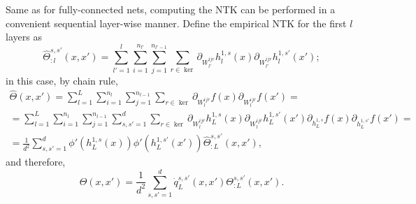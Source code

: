 \documentclass{article}
\begin{document}
    Same as for fully-connected nets, computing the NTK can be performed in a convenient sequential layer-wise manner.
    Define the empirical NTK for the first $l$ layers as
    \begin{equation}
        \hat\Theta_{:l}^{s,s'}(x,x') 
        = \sum_{l'=1}^l \sum_{i=1}^{n_{l'}} \sum_{j=1}^{n_{l'-1}} \sum_{r \in \ker} \partial_{W_{l'}^{ijr}} h_l^{1,s}(x) \partial_{W_{l'}^{ijr}} h_l^{1,s'}(x');
    \end{equation}
    in this case, by chain rule,
    \begin{multline}
        \hat\Theta(x,x')
        = \sum_{l=1}^L \sum_{i=1}^{n_l} \sum_{j=1}^{n_{l-1}} \sum_{r \in \ker} \partial_{W_l^{ijr}} f(x) \partial_{W_l^{ijr}} f(x')
        =\\= \sum_{l=1}^L \sum_{i=1}^{n_l} \sum_{j=1}^{n_{l-1}} \sum_{s,s'=1}^d \sum_{r \in \ker} \partial_{W_l^{ijr}} h_L^{1,s}(x) \partial_{W_l^{ijr}} h_L^{1,s'}(x') \partial_{h_L^{1,s}} f(x) \partial_{h_L^{1,s'}} f(x')
        =\\= \frac{1}{d^2} \sum_{s,s'=1}^d \phi'(h_L^{1,s}(x)) \phi'(h_L^{1,s'}(x')) \hat\Theta_{:L}^{s,s'}(x,x'),
    \end{multline}
    and therefore,
    \begin{equation}
        \Theta(x,x')
        = \frac{1}{d^2} \sum_{s,s'=1}^d \dot q_L^{s,s'}(x,x') \Theta_{:L}^{s,s'}(x,x').
    \end{equation}
\end{document}

